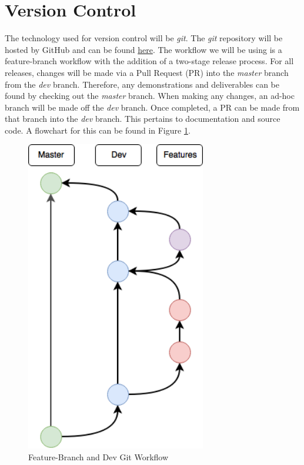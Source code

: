 \documentclass[11pt]{article}
\begin{document}
\section{Version Control}
The technology used for version control will be \textit{git}. The \textit{git} repository will be hosted by GitHub and can be found \href{https://github.com/ChristopherMcDonald/SoftwareTronCapstone}{here}. The workflow we will be using is a feature-branch workflow with the addition of a two-stage release process. For all releases, changes will be made via a Pull Request (PR) into the \textit{master} branch from the \textit{dev} branch. Therefore, any demonstrations and deliverables can be found by checking out the \textit{master} branch. When making any changes, an ad-hoc branch will be made off the \textit{dev} branch. Once completed, a PR can be made from that branch into the \textit{dev} branch. This pertains to documentation and source code. A flowchart for this can be found in Figure \ref{fig:git}.
\begin{figure}[htbp]
   \centering
   \includegraphics[width=0.7\textwidth]{img/git.png} %
   \caption{Feature-Branch and Dev Git Workflow}
   \label{fig:git}
\end{figure}
\end{document}
